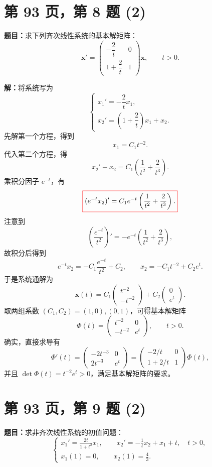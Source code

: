 \documentclass[11pt,a4paper]{ctexart}
\newcommand{\xx}{\boldsymbol{x}}
\begin{document}
\newpage
\section*{第 93 页，第 8 题 (2)}
\textbf{题目：}求下列齐次线性系统的基本解矩阵：
\[
\xx'=\begin{pmatrix}-\dfrac2t&0\\[3pt]1+\dfrac2t&1\end{pmatrix}\xx,
\qquad t>0.
\]

\textbf{解：}将系统写为
\[
\begin{cases}
x_1'=-\dfrac2t x_1,\\[4pt]
x_2'=\left(1+\dfrac2t\right)x_1+x_2.
\end{cases}
\]
先解第一个方程，得到
\[
x_1=C_1t^{-2}.
\]
代入第二个方程，得
\[
x_2'-x_2=C_1\left(\frac1{t^2}+\frac2{t^3}\right).
\]
乘积分因子 $e^{-t}$，有
\[
{\color{red}\boxed{\color{black}(e^{-t}x_2)'=C_1e^{-t}\left(\frac1{t^2}+\frac2{t^3}\right).}}
\]
注意到
\[
\left(\frac{e^{-t}}{t^2}\right)'
=-e^{-t}\left(\frac1{t^2}+\frac2{t^3}\right),
\]
故积分后得到
\[
e^{-t}x_2=-C_1\frac{e^{-t}}{t^2}+C_2,
\qquad x_2=-C_1t^{-2}+C_2e^t.
\]
于是系统通解为
\[
\xx(t)=C_1\begin{pmatrix}t^{-2}\\-t^{-2}\end{pmatrix}
+C_2\begin{pmatrix}0\\e^t\end{pmatrix}.
\]
取两组系数 $(C_1,C_2)=(1,0),(0,1)$，可得基本解矩阵
\[
\boxed{\Phi(t)=\begin{pmatrix}t^{-2}&0\\-t^{-2}&e^t\end{pmatrix},\qquad t>0.}
\]
确实，直接求导有
\[
\Phi'(t)=\begin{pmatrix}-2t^{-3}&0\\2t^{-3}&e^t\end{pmatrix}
=\begin{pmatrix}-2/t&0\\1+2/t&1\end{pmatrix}\Phi(t),
\]
并且 $\det\Phi(t)=t^{-2}e^t>0$，满足基本解矩阵的要求。

\newpage
\section*{第 93 页，第 9 题 (2)}
\textbf{题目：}求非齐次线性系统的初值问题：
\[
\begin{cases}
\displaystyle x_1'=\frac{2t}{1+t^2}x_1,\qquad
x_2'=-\frac1t x_2+x_1+t,\quad t>0,\\[6pt]
\displaystyle x_1(1)=0,\qquad x_2(1)=\frac43.
\end{cases}
\]
\end{document}
